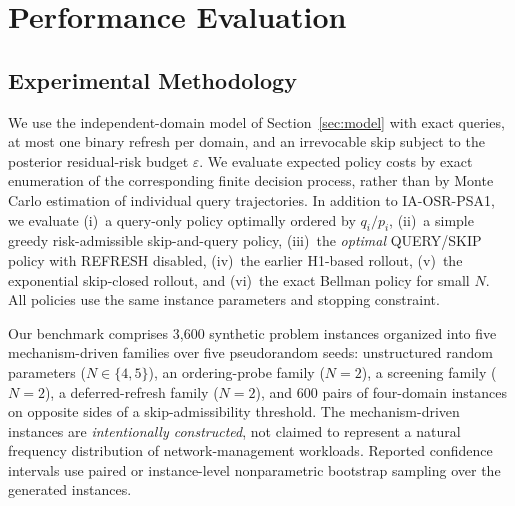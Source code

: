 \section{Performance Evaluation}
\label{sec:eval}
\subsection{Experimental Methodology}
We use the independent-domain model of Section~\ref{sec:model} with
exact queries, at most one binary refresh per domain, and an
irrevocable skip subject to the posterior residual-risk budget
$\varepsilon$. We evaluate expected policy costs by exact enumeration
of the corresponding finite decision process, rather than by
Monte Carlo estimation of individual query trajectories. In addition
to IA-OSR-PSA1, we evaluate (i)~a query-only policy optimally ordered
by $q_i/p_i$, (ii)~a simple greedy risk-admissible skip-and-query
policy, (iii)~the \emph{optimal} QUERY/SKIP policy with REFRESH disabled,
(iv)~the earlier H1-based rollout, (v)~the exponential
skip-closed rollout, and (vi)~the exact Bellman policy for small $N$.
All policies use the same instance parameters and stopping constraint.

Our benchmark comprises 3,600 synthetic problem instances organized
into five mechanism-driven families over five pseudorandom seeds:
unstructured random parameters ($N\in\{4,5\}$), an ordering-probe
family ($N=2$), a screening family ($N=2$), a deferred-refresh family
($N=2$), and 600 pairs of four-domain instances on opposite sides of
a skip-admissibility threshold. The mechanism-driven instances are
\emph{intentionally constructed}, not claimed to represent a natural
frequency distribution of network-management workloads. Reported
confidence intervals use paired or instance-level nonparametric
bootstrap sampling over the generated instances.

